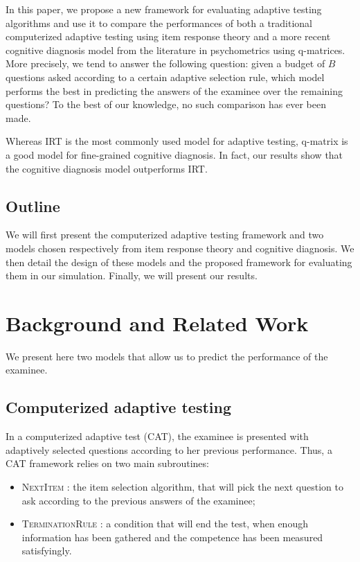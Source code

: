 \documentclass{sig-alternate}
\begin{document}
In this paper, we propose a new framework for evaluating adaptive testing algorithms and use it to compare the performances of both a traditional computerized adaptive testing using item response theory and a more recent cognitive diagnosis model from the literature in psychometrics using q-matrices. More precisely, we tend to answer the following question: given a budget of $B$ questions asked according to a certain adaptive selection rule, which model performs the best in predicting the answers of the examinee over the remaining questions? To the best of our knowledge, no such comparison has ever been made.

Whereas IRT is the most commonly used model for adaptive testing, q-matrix is a good model for fine-grained cognitive diagnosis. In fact, our results show that the cognitive diagnosis model outperforms IRT.

\subsection{Outline}

We will first present the computerized adaptive testing framework and two models chosen respectively from item response theory and cognitive diagnosis. We then detail the design of these models and the proposed framework for evaluating them in our simulation. Finally, we will present our results.

\section{Background and Related Work}

We present here two models that allow us to predict the performance of the examinee.

\subsection{Computerized adaptive testing}

In a computerized adaptive test (CAT), the examinee is presented with adaptively selected questions according to her previous performance. Thus, a CAT framework relies on two main subroutines:
\begin{itemize}
\item \textsc{NextItem} : the item selection algorithm, that will pick the next question to ask according to the previous answers of the examinee;
\item \textsc{TerminationRule} : a condition that will end the test, when enough information has been gathered and the competence has been measured satisfyingly.
\end{itemize}
\end{document}
